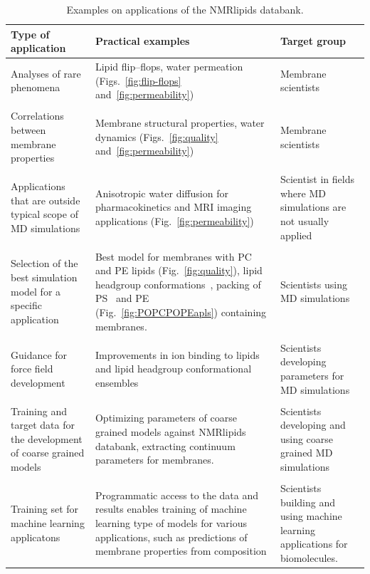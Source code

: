 \documentclass[fleqn,10pt]{wlscirep}
\begin{document}
\begin{table}[t]
    \centering
    \begin{tabular}{p{5.0cm}  p{5.0cm}  p{4.0cm}}
    Type of application     & Practical examples & Target group \\
    \hline
    Analyses of rare phenomena               & Lipid flip--flops, water permeation (Figs.~\ref{fig:flip-flops} and~\ref{fig:permeability}) & Membrane scientists \\
    \\
    Correlations between membrane properties & 
    Membrane structural properties, water dynamics (Figs.~\ref{fig:quality} and~\ref{fig:permeability}) & 
    Membrane scientists \\
    \\
    Applications that are outside typical scope of MD simulations & 
    Anisotropic water diffusion for pharmacokinetics and MRI imaging applications (Fig.~\ref{fig:permeability}) & 
    Scientist in fields where MD simulations are not usually applied \\
    \\
    Selection of the best simulation model for a specific application & 
    Best model for membranes with PC and PE lipids (Fig.~\ref{fig:quality}), lipid headgroup conformations~\cite{bacle21}, 
    packing of PS~\cite{antila22b} and PE (Fig.~\ref{fig:POPCPOPEapls}) containing membranes. &
    Scientists using MD simulations \\
    \\
    Guidance for force field development & 
    Improvements in ion binding to lipids~\cite{melcr18,melcr20} and lipid headgroup conformational ensembles~\cite{yu21,dickson22,grote20} &
    Scientists developing parameters for MD simulations \\
    \\
    Training and target data for the development of coarse grained models & 
    Optimizing parameters of coarse grained models against NMRlipids databank, extracting continuum parameters for membranes. &
    Scientists developing and using coarse grained MD simulations \\
    \\
    Training set for machine learning applicatons &
    Programmatic access to the data and results enables training of machine learning type of models for various applications, such as predictions of membrane properties from composition & Scientists building and using machine learning applications for biomolecules.  
    \end{tabular}
    \caption{Examples on applications of the NMRlipids databank.}
    \label{tab:applications}
\end{table}
\end{document}
